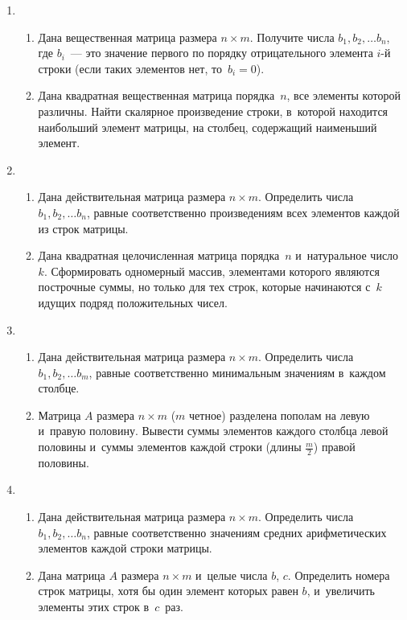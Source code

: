 \documentclass{article}
\begin{document}
\begin{enumerate}[label={}, leftmargin=0pt, itemindent=0pt]
\item
\begin{enumerate}[label=\arabic{enumi}.\arabic*.] %
  \item
  Дана вещественная матрица размера $n × m$. Получите числа $b_1, b_2, \ldots b_n$, где $b_i$~— это значение первого по порядку отрицательного элемента $i$-й строки (если таких элементов нет, то~$b_i = 0$).
  \item
  Дана квадратная вещественная матрица порядка~$n$, все элементы которой различны. Найти скалярное произведение строки, в~которой находится наибольший элемент матрицы, на столбец, содержащий наименьший элемент.
\end{enumerate}

\item
\begin{enumerate}[label=\arabic{enumi}.\arabic*.] %
  \item
  Дана действительная матрица размера $n\times m$. Определить числа $b_1, b_2, \ldots b_n$, равные соответственно произведениям всех элементов каждой из строк матрицы.
  \item
  Дана квадратная целочисленная матрица порядка~$n$ и~натуральное число $k$. Сформировать одномерный массив, элементами которого являются построчные суммы, но только для тех строк, которые начинаются с~$k$ идущих подряд положительных чисел.
\end{enumerate}

\item
\begin{enumerate}[label=\arabic{enumi}.\arabic*.] %
  \item
  Дана действительная матрица размера $n × m$. Определить числа $b_1, b_2, \ldots b_m$, равные соответственно минимальным значениям в~каждом столбце.
  \item
  Матрица $A$ размера $n × m$ ($m$ четное) разделена пополам на левую и~правую половину. Вывести суммы элементов каждого столбца левой половины и~суммы элементов каждой строки (длины $\frac{m}{2}$) правой половины.
\end{enumerate}

\item
\begin{enumerate}[label=\arabic{enumi}.\arabic*.] %
  \item
  Дана действительная матрица размера $n\times m$. Определить числа $b_1, b_2, \ldots b_n$, равные соответственно значениям средних арифметических элементов каждой строки матрицы.
  \item
  Дана матрица $A$ размера $n\times m$ и~целые числа $b$, $c$. Определить номера строк матрицы, хотя бы один элемент которых равен $b$, и~увеличить элементы этих строк в~$c$~раз.
\end{enumerate}


\end{enumerate}
\end{document}
